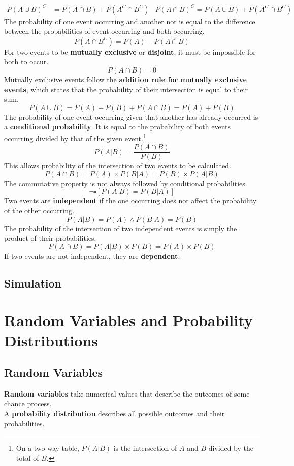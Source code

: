 \documentclass[../AP_Statistics.tex]{subfiles}
\begin{document}
		\begin{align*}
			P(A\cup B)^C &= P(A\cap B) + P\left(A^C\cap B^C\right)	& P(A\cap B)^C = P(A\cup B) + P\left(A^C \cap B^C\right)
			\end{align*}
		The probability of one event occurring and another not is equal to the difference between the probabilities of event occurring and both occurring.
		$$P\left(A\cap B^C\right) = P(A) - P(A\cap B)$$
		For two events to be \textbf{mutually exclusive} or \textbf{disjoint}, it must be impossible for both to occur.
		$$P(A\cap B) = 0$$
		Mutually exclusive events follow the \textbf{addition rule for mutually exclusive events}, which states that the probability of their intersection is equal to their sum.
		$$P(A\cup B) = P(A) + P(B) + P(A\cap B) = P(A) + P(B)$$
		The probability of one event occurring given that another has already occurred is a \textbf{conditional probability}. It is equal to the probability of both events occurring divided by that of the given event.\footnote{On a two-way table, $P(A|B)$ is the intersection of $A$ and $B$ divided by the total of $B$.}
		$$P(A|B) = \frac{P(A\cap B)}{P(B)}$$
		This allows probability of the intersection of two events to be calculated.
		$$P(A\cap B) = P(A) \times P(B|A) = P(B) \times P(A|B)$$
		The commutative property is not always followed by conditional probabilities.
		$$\lnot\square[P(A|B) = P(B|A)]$$
		Two events are \textbf{independent} if the one occurring does not affect the probability of the other occurring.
		$$P(A|B) = P(A) \land P(B|A) = P(B)$$
		The probability of the intersection of two independent events is simply the product of their probabilities.
		$$P(A\cap B) = P(A|B) \times P(B) = P(A) \times P(B)$$
		If two events are not independent, they are \textbf{dependent}.
		\section*{Simulation}
	\chapter{Random Variables and Probability Distributions}
		\section{Random Variables}
			\textbf{Random variables} take numerical values that describe the outcomes of some chance process. \\
			A \textbf{probability distribution} describes all possible outcomes and their probabilities. \\
\end{document}

